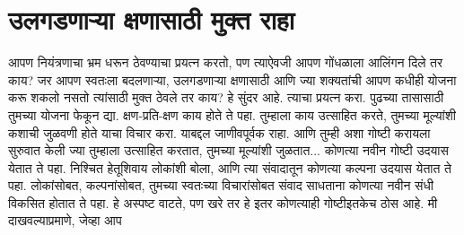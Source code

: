 \chapter{उलगडणाऱ्या क्षणासाठी मुक्त राहा}
आपण नियंत्रणाचा भ्रम धरून ठेवण्याचा प्रयत्न करतो, पण त्याऐवजी आपण गोंधळाला आलिंगन दिले तर काय? जर आपण स्वतःला बदलणाऱ्या, उलगडणाऱ्या क्षणासाठी आणि ज्या शक्यतांची आपण कधीही योजना करू शकलो नसतो त्यांसाठी मुक्त ठेवले तर काय?
हे सुंदर आहे.
त्याचा प्रयत्न करा. पुढच्या तासासाठी तुमच्या योजना फेकून द्या. क्षण-प्रति-क्षण काय होते ते पहा. तुम्हाला काय उत्साहित करते, तुमच्या मूल्यांशी कशाची जुळवणी होते याचा विचार करा. याबद्दल जाणीवपूर्वक राहा.
आणि तुम्ही अशा गोष्टी करायला सुरुवात केली ज्या तुम्हाला उत्साहित करतात, तुमच्या मूल्यांशी जुळतात... कोणत्या नवीन गोष्टी उदयास येतात ते पहा. निश्चित हेतूशिवाय लोकांशी बोला, आणि त्या संवादातून कोणत्या कल्पना उदयास येतात ते पहा. लोकांसोबत, कल्पनांसोबत, तुमच्या स्वतःच्या विचारांसोबत संवाद साधताना कोणत्या नवीन संधी विकसित होतात ते पहा.
हे अस्पष्ट वाटते, पण खरे तर हे इतर कोणत्याही गोष्टीइतकेच ठोस आहे. मी दाखवल्याप्रमाणे, जेव्हा आप